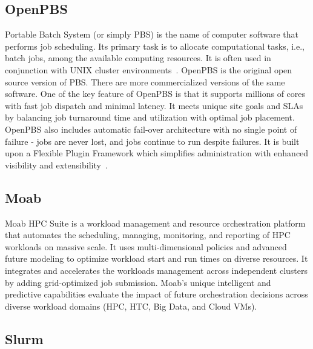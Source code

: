      \pv

\subsection{OpenPBS}

Portable Batch System (or simply PBS) is the name of computer software
that performs job scheduling. Its primary task is to allocate
computational tasks, i.e., batch jobs, among the available computing
resources. It is often used in conjunction with UNIX cluster
environments~\cite{openpbs-wiki}. OpenPBS is the original open source
version of PBS. There are more commercialized versions of the same
software. One of the key feature of OpenPBS is that it supports
millions of cores with fast job dispatch and minimal latency. It meets
unique site goals and SLAs by balancing job turnaround time and
utilization with optimal job placement. OpenPBS also includes
automatic fail-over architecture with no single point of failure -
jobs are never lost, and jobs continue to run despite failures. It is
built upon a Flexible Plugin Framework which simplifies administration
with enhanced visibility and extensibility~\cite{openpbs-www}.

\subsection{Moab}

     Moab HPC Suite is a workload management and resource orchestration
     platform that automates the scheduling, managing, monitoring, and
     reporting of HPC workloads on massive scale. It uses multi-dimensional
     policies and advanced future modeling to optimize workload start and
     run times on diverse resources. It integrates and accelerates the
     workloads management across independent clusters by adding
     grid-optimized job submission. Moab's unique intelligent and
     predictive capabilities evaluate the impact of future orchestration
     decisions across diverse workload domains (HPC, HTC, Big Data, and
     Cloud VMs)\cite{www-moab}.

\subsection{Slurm }

